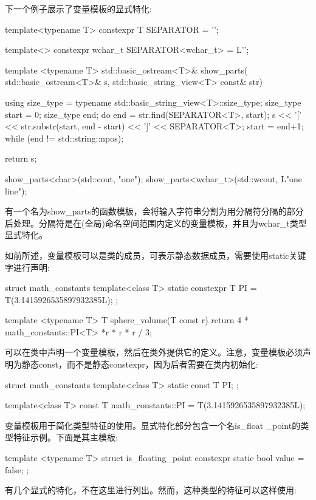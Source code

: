 下一个例子展示了变量模板的显式特化:

\begin{cpp}
template<typename T>
constexpr T SEPARATOR = '\n';

template<>
constexpr wchar_t SEPARATOR<wchar_t> = L'\n';

template <typename T>
std::basic_ostream<T>& show_parts(
	std::basic_ostream<T>& s,
	std::basic_string_view<T> const& str)
{
	using size_type =
		typename std::basic_string_view<T>::size_type;
	size_type start = 0;
	size_type end;
	do
	{
		end = str.find(SEPARATOR<T>, start);
		s << '[' << str.substr(start, end - start) << ']'
		<< SEPARATOR<T>;
		start = end+1;
	} while (end != std::string::npos);

	return s;
}

show_parts<char>(std::cout, "one\ntwo\nthree");
show_parts<wchar_t>(std::wcout, L"one line");
\end{cpp}

有一个名为show\_parts的函数模板，会将输入字符串分割为用分隔符分隔的部分后处理。分隔符是在(全局)命名空间范围内定义的变量模板，并且为wchar\_t类型显式特化。

如前所述，变量模板可以是类的成员，可表示静态数据成员，需要使用static关键字进行声明:

\begin{cpp}
struct math_constants
{
	template<class T>
	static constexpr T PI = T(3.1415926535897932385L);
};

template <typename T>
T sphere_volume(T const r)
{
	return 4 * math_constants::PI<T> *r * r * r / 3;
}
\end{cpp}

可以在类中声明一个变量模板，然后在类外提供它的定义。注意，变量模板必须声明为静态const，而不是静态constexpr，因为后者需要在类内初始化:

\begin{cpp}
struct math_constants
{
	template<class T>
	static const T PI;
};

template<class T>
const T math_constants::PI = T(3.1415926535897932385L);
\end{cpp}

变量模板用于简化类型特征的使用。显式特化部分包含一个名is\_float \_point的类型特征示例。下面是其主模板:

\begin{cpp}
template <typename T>
struct is_floating_point
{
	constexpr static bool value = false;
};
\end{cpp}

有几个显式的特化，不在这里进行列出。然而，这种类型的特征可以这样使用:

